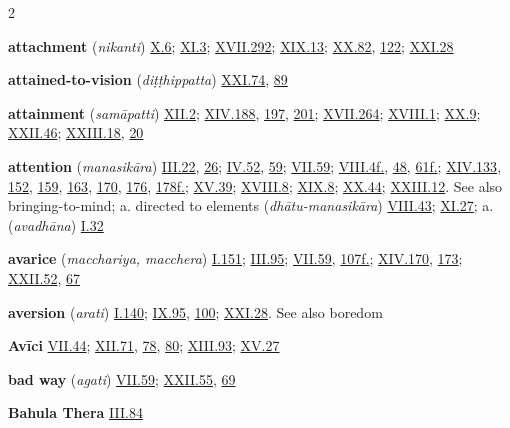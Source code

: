\begin{multicols}{2}
\begin{vismHanging}
\par\textbf{attachment} (\emph{nikanti}) \hyperlink{X.6}{X.6}{}; \hyperlink{XI.3}{XI.3}{}; \hyperlink{XVII.292}{XVII.292}{}; \hyperlink{XIX.13}{XIX.13}{}; \hyperlink{XX.82}{XX.82}{}, \hyperlink{XX.122}{122}{}; \hyperlink{XXI.28}{XXI.28}{}
\par\textbf{attained-to-vision} (\emph{diṭṭhippatta}) \hyperlink{XXI.74}{XXI.74}{}, \hyperlink{XXI.89}{89}{}
\par\textbf{attainment} (\emph{samāpatti}) \hyperlink{XII.2}{XII.2}{}; \hyperlink{XIV.188}{XIV.188}{}, \hyperlink{XIV.197}{197}{}, \hyperlink{XIV.201}{201}{}; \hyperlink{XVII.264}{XVII.264}{}; \hyperlink{XVIII.1}{XVIII.1}{}; \hyperlink{XX.9}{XX.9}{}; \hyperlink{XXII.46}{XXII.46}{}; \hyperlink{XXIII.18}{XXIII.18}{}, \hyperlink{XXIII.20}{20}{}
\par\textbf{attention} (\emph{manasikāra}) \hyperlink{III.22}{III.22}{}, \hyperlink{III.26}{26}{}; \hyperlink{IV.52}{IV.52}{}, \hyperlink{IV.59}{59}{}; \hyperlink{VII.59}{VII.59}{}; \hyperlink{VIII.4}{VIII.4f.}{}, \hyperlink{VIII.48}{48}{}, \hyperlink{VIII.61}{61f.}{}; \hyperlink{XIV.133}{XIV.133}{}, \hyperlink{XIV.152}{152}{}, \hyperlink{XIV.159}{159}{}, \hyperlink{XIV.163}{163}{}, \hyperlink{XIV.170}{170}{}, \hyperlink{XIV.176}{176}{}, \hyperlink{XIV.178}{178f.}{}; \hyperlink{XV.39}{XV.39}{}; \hyperlink{XVIII.8}{XVIII.8}{}; \hyperlink{XIX.8}{XIX.8}{}; \hyperlink{XX.44}{XX.44}{}; \hyperlink{XXIII.12}{XXIII.12}{}. See also bringing-to-mind; a. directed to elements (\emph{dhātu-manasikāra}) \hyperlink{VIII.43}{VIII.43}{}; \hyperlink{XI.27}{XI.27}{}; a. (\emph{avadhāna}) \hyperlink{I.32}{I.32}{}
\par\textbf{avarice} (\emph{macchariya, macchera}) \hyperlink{I.151}{I.151}{}; \hyperlink{III.95}{III.95}{}; \hyperlink{VII.59}{VII.59}{}, \hyperlink{VII.107}{107f.}{}; \hyperlink{XIV.170}{XIV.170}{}, \hyperlink{XIV.173}{173}{}; \hyperlink{XXII.52}{XXII.52}{}, \hyperlink{XXII.67}{67}{}
\par\textbf{aversion} (\emph{arati}) \hyperlink{I.140}{I.140}{}; \hyperlink{IX.95}{IX.95}{}, \hyperlink{IX.100}{100}{}; \hyperlink{XXI.28}{XXI.28}{}. See also boredom
\par\textbf{Avīci} \hyperlink{VII.44}{VII.44}{}; \hyperlink{XII.71}{XII.71}{}, \hyperlink{XII.78}{78}{}, \hyperlink{XII.80}{80}{}; \hyperlink{XIII.93}{XIII.93}{}; \hyperlink{XV.27}{XV.27}{}
\par\textbf{bad way} (\emph{agati}) \hyperlink{VII.59}{VII.59}{}; \hyperlink{XXII.55}{XXII.55}{}, \hyperlink{XXII.69}{69}{}
\par\textbf{Bahula Thera} \hyperlink{III.84}{III.84}{}

\end{vismHanging}
\end{multicols}
